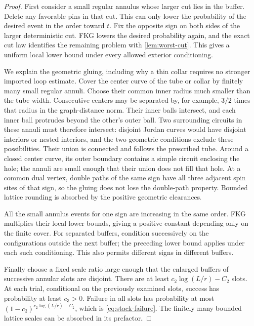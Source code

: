 \begin{proof}
First consider a small regular annulus whose larger cut lies in the
buffer.  Delete any favorable pins in that cut.  This can only lower the
probability of the desired event in the order toward $t$.  Fix the
opposite sign on both sides of the larger deterministic cut.  FKG lowers
the desired probability again, and the exact cut law identifies the
remaining problem with \cref{lem:worst-cut}.  This gives a uniform local
lower bound under every allowed exterior conditioning.

We explain the geometric gluing, including why a thin collar requires
no stronger imported loop estimate.  Cover the center curve of the tube
or collar by finitely many small regular annuli.  Choose their common
inner radius much smaller than the tube width.  Consecutive centers may
be separated by, for example, $3/2$ times that radius in the graph-distance
norm.  Their inner balls intersect, and each inner ball protrudes beyond
the other's outer ball.  Two surrounding circuits in these annuli must
therefore intersect: disjoint Jordan curves would have disjoint interiors
or nested interiors, and the two geometric conditions exclude these
possibilities.  Their union is connected and follows the prescribed
tube.  Around a closed center curve, its outer boundary contains a simple
circuit enclosing the hole; the annuli are small enough that their union
does not fill that hole.  At a common dual vertex, double paths of the
same sign have all three adjacent spin sites of that sign, so the gluing
does not lose the double-path property.  Bounded lattice rounding is
absorbed by the positive geometric clearances.

All the small annulus events for one sign are increasing in the same
order.  FKG multiplies their local lower bounds, giving a positive
constant depending only on the finite cover.  For separated buffers,
condition successively on the configurations outside the next buffer;
the preceding lower bound applies under each such conditioning.  This
also permits different signs in different buffers.

Finally choose a fixed scale ratio large enough that the enlarged buffers
of successive annular slots are disjoint.  There are at least
$c_2\log(L/r)-C_2$ slots.  At each trial, conditional on the previously
examined slots, success has probability at least $c_3>0$.  Failure in all
slots has probability at most $(1-c_3)^{c_2\log(L/r)-C_2}$, which is
\eqref{eq:stack-failure}.  The finitely many bounded lattice scales can be
absorbed in its prefactor.
\end{proof}


